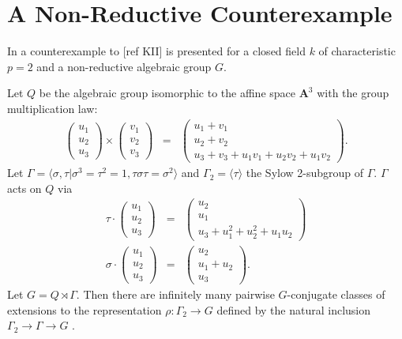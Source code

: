 \section{A Non-Reductive Counterexample}
In \cite{slodowy1997two} a counterexample to [ref KII] is presented for a closed field $k$ of characteristic $p = 2$ and a non-reductive algebraic group $G$.
\begin{example} Let $Q$ be the algebraic group isomorphic to the affine space $\mathbf{A}^3$ with the group multiplication law:
\begin{eqnarray*}
	\left(\begin{matrix} u_1 \\ u_2 \\ u_3 \end{matrix}\right) \times
	\left(\begin{matrix} v_1 \\ v_2 \\ v_3 \end{matrix}\right) &=&
	\left(\begin{matrix} u_1 + v_1 \\ u_2 + v_2 \\ u_3 + v_3 + u_1v_1 + u_2v_2 + u_1v_2 \end{matrix}\right).
\end{eqnarray*}
Let $\Gamma = \langle \sigma, \tau | \sigma^3 = \tau^2 = 1, \tau\sigma\tau = \sigma^2 \rangle$ and $\Gamma_2 = \langle \tau \rangle$ the Sylow 2-subgroup of $\Gamma$. $\Gamma$ acts on $Q$ via
\begin{eqnarray*}
	\tau \cdot \left(\begin{matrix} u_1 \\ u_2 \\ u_3 \end{matrix} \right) &=&
	\left(\begin{matrix} u_2 \\ u_1 \\ u_3 + u_1^2 + u_2^2 + u_1u_2 \end{matrix} \right) \\
	\sigma \cdot \left(\begin{matrix} u_1 \\ u_2 \\ u_3 \end{matrix} \right) &=&
	\left(\begin{matrix} u_2 \\ u_1 + u_2 \\ u_3 \end{matrix} \right).
\end{eqnarray*}
Let $G = Q \rtimes \Gamma$. Then there are infinitely many pairwise $G$-conjugate classes of extensions to the representation $\rho:\Gamma_2 \rightarrow G$ defined by the natural inclusion $\Gamma_2 \rightarrow \Gamma \rightarrow G$ \cite[Appendix]{slodowy1997two}.
\end{example}
